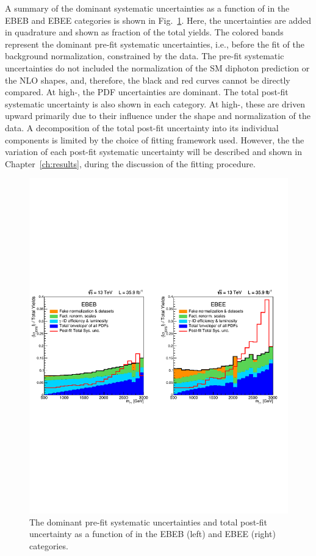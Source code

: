 A summary of the dominant systematic uncertainties as a function of \mgg in the EBEB and EBEE categories is shown in Fig.~\ref{fig:sys_unc}. Here, the uncertainties are added in quadrature and shown as fraction of the total yields. The colored bands represent the dominant pre-fit systematic uncertainties, i.e., before the fit of the background normalization, constrained by the data. The pre-fit systematic uncertainties do not included the normalization of the SM diphoton prediction or the NLO shapes, and, therefore, the black and red curves cannot be directly compared. At high-\mgg, the PDF uncertainties are dominant. The total post-fit systematic uncertainty is also shown in each category. At high-\mgg, these are driven upward primarily due to their influence under the shape and normalization of the data. A decomposition of the total post-fit uncertainty into its individual components is limited by the choice of fitting framework used. However, the the variation of each post-fit systematic uncertainty will be described and shown in Chapter~\ref{ch:results}, during the discussion of the fitting procedure.

\begin{figure}[!htbp]
	\centering
	\includegraphics[width=1.0\textwidth]{figures/PLOT_PRED_PULL_SYS.pdf}
	\caption{The dominant pre-fit systematic uncertainties and total post-fit uncertainty as a function of \mgg in the EBEB (left) and EBEE (right) categories.}
	\label{fig:sys_unc}
\end{figure}




